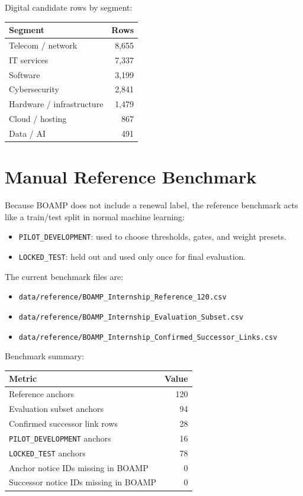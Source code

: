 \documentclass[11pt,a4paper]{article}
\newcommand{\code}[1]{\texttt{#1}}
\newcommand{\pathcode}[1]{{\small\nolinkurl{#1}}}
\begin{document}
Digital candidate rows by segment:

\begin{center}
\begin{tabular}{lr}
\toprule
Segment & Rows \\
\midrule
Telecom / network & 8,655 \\
IT services & 7,337 \\
Software & 3,199 \\
Cybersecurity & 2,841 \\
Hardware / infrastructure & 1,479 \\
Cloud / hosting & 867 \\
Data / AI & 491 \\
\bottomrule
\end{tabular}
\end{center}

\section*{Manual Reference Benchmark}

Because BOAMP does not include a renewal label, the reference benchmark acts like a train/test split in normal machine learning:

\begin{itemize}
  \item \code{PILOT\_DEVELOPMENT}: used to choose thresholds, gates, and weight presets.
  \item \code{LOCKED\_TEST}: held out and used only once for final evaluation.
\end{itemize}

The current benchmark files are:

\begin{itemize}
  \item \pathcode{data/reference/BOAMP_Internship_Reference_120.csv}
  \item \pathcode{data/reference/BOAMP_Internship_Evaluation_Subset.csv}
  \item \pathcode{data/reference/BOAMP_Internship_Confirmed_Successor_Links.csv}
\end{itemize}

Benchmark summary:

\begin{center}
\begin{tabular}{lr}
\toprule
Metric & Value \\
\midrule
Reference anchors & 120 \\
Evaluation subset anchors & 94 \\
Confirmed successor link rows & 28 \\
\code{PILOT\_DEVELOPMENT} anchors & 16 \\
\code{LOCKED\_TEST} anchors & 78 \\
Anchor notice IDs missing in BOAMP & 0 \\
Successor notice IDs missing in BOAMP & 0 \\
\bottomrule
\end{tabular}
\end{center}
\end{document}
